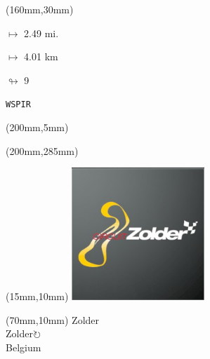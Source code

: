 \begin{textblock*}{40mm}(160mm,30mm)%
\Large
\par$\mapsto$ 2.49 mi.
\par$\mapsto$ 4.01 km
\par$\looparrowright$ 9
\par\hfill\tiny\tt WSPIR\\
\end{textblock*}
\begin{textblock*}{20mm}(200mm,5mm)%
\fbox{\thepage}
\label{WSPIR}
\end{textblock*}
\begin{textblock*}{20mm}(200mm,285mm)%
\fbox{\thepage}
\end{textblock*}

\null\newpage
\begin{textblock*}{50mm}(15mm,10mm)%
\includegraphics[width=50mm]{LG/2015-05-20_00100.png}
\end{textblock*}
\begin{textblock*}{130mm}(70mm,10mm)%
{\fontsize{20}{20}\selectfont Zolder\\}
{\fontsize{16}{16}\selectfont Zolder\hfill \Large$\circlearrowright$\\}
{\fontsize{12}{12}\selectfont Belgium\\}
\end{textblock*}
